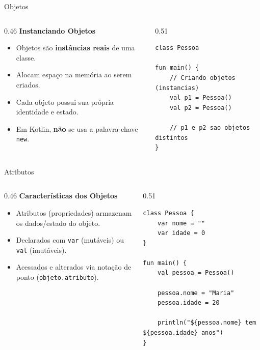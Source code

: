\documentclass[aspectratio=169]{beamer}
\begin{document}
\begin{frame}[fragile]{Objetos}
  \begin{columns}[T]
    \begin{column}{0.46\textwidth}
      \textbf{Instanciando Objetos}
      \vspace{0.3em}
      \begin{itemize}\small
        \item Objetos são \textbf{instâncias reais} de uma classe.
        \item Alocam espaço na memória ao serem criados.
        \item Cada objeto possui sua própria identidade e estado.
        \item Em Kotlin, \textbf{não} se usa a palavra-chave \texttt{new}.
      \end{itemize}
    \end{column}
    \begin{column}{0.51\textwidth}
\begin{lstlisting}[style=KotlinStyle]
class Pessoa

fun main() {
    // Criando objetos (instancias)
    val p1 = Pessoa()
    val p2 = Pessoa()
    
    // p1 e p2 sao objetos distintos
}
\end{lstlisting}
    \end{column}
  \end{columns}
\end{frame}

\begin{frame}[fragile]{Atributos}
  \begin{columns}[T]
    \begin{column}{0.46\textwidth}
      \textbf{Características dos Objetos}
      \vspace{0.3em}
      \begin{itemize}\small
        \item Atributos (propriedades) armazenam os dados/estado do objeto.
        \item Declarados com \texttt{var} (mutáveis) ou \texttt{val} (imutáveis).
        \item Acessados e alterados via notação de ponto (\texttt{objeto.atributo}).
      \end{itemize}
    \end{column}
    \begin{column}{0.51\textwidth}
\begin{lstlisting}[style=KotlinStyle]
class Pessoa {
    var nome = ""
    var idade = 0
}

fun main() {
    val pessoa = Pessoa()

    pessoa.nome = "Maria"
    pessoa.idade = 20

    println("${pessoa.nome} tem ${pessoa.idade} anos")
}
\end{lstlisting}
    \end{column}
  \end{columns}
\end{frame}
\end{document}
